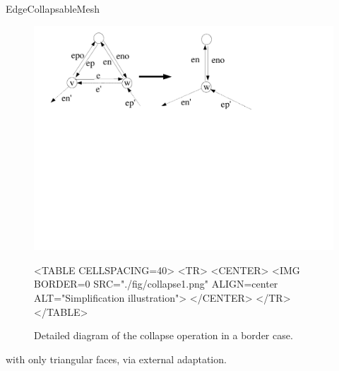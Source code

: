 \begin{ccRefConcept}{EdgeCollapsableMesh}
\begin{figure}[htbp]
\begin{ccTexOnly}
\begin{center}
\includegraphics[width=17cm]{Surface_mesh_simplification_ref/fig/collapse1} %
\end{center}
\end{ccTexOnly}
\begin{ccHtmlOnly}
<TABLE CELLSPACING=40>
<TR>
<CENTER>
<IMG BORDER=0 SRC="./fig/collapse1.png" ALIGN=center ALT="Simplification illustration">
</CENTER>
</TR>
</TABLE>
\end{ccHtmlOnly}
\caption{Detailed diagram of the collapse operation in a border case.}
\end{figure}


\ccHasModels
{} with only triangular faces, via external adaptation.

\ccSeeAlso
{}\\

\end{ccRefConcept}

